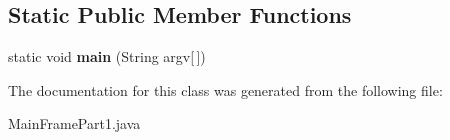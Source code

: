 \subsection*{Static Public Member Functions}
\begin{DoxyCompactItemize}
\item 
\hypertarget{classMainFramePart1_a7facdd552ebf47dcc8b8372ea6875c12}{}static void {\bfseries main} (String argv\mbox{[}$\,$\mbox{]})\label{classMainFramePart1_a7facdd552ebf47dcc8b8372ea6875c12}

\end{DoxyCompactItemize}


The documentation for this class was generated from the following file\+:\begin{DoxyCompactItemize}
\item 
Main\+Frame\+Part1.\+java\end{DoxyCompactItemize}
